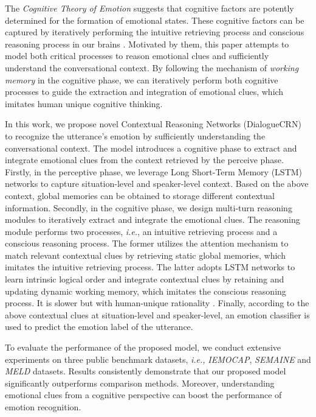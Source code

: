 \documentclass[11pt,a4paper]{article}
\begin{document}
The \textit{Cognitive Theory of Emotion} \cite{article1962,scherer2001appraisal} suggests that cognitive factors are potently determined for the formation of emotional states.
These cognitive factors can be captured by iteratively performing the intuitive retrieving process and conscious reasoning process in our brains \cite{evans1984heuristic,evans2003two,evans2008dual,sloman1996empirical}. 
Motivated by them, this paper attempts to model both critical processes to reason emotional clues and sufficiently understand the conversational context.
By following the mechanism of \textit{working memory} \cite{baddeley1992working} in the cognitive phase, we can iteratively perform both cognitive processes to guide the extraction and integration of emotional clues, which imitates human unique cognitive thinking.




In this work, we propose novel Contextual Reasoning Networks (DialogueCRN) to recognize the utterance's emotion by sufficiently understanding the conversational context.
The model introduces a cognitive phase to extract and integrate emotional clues from the context retrieved by the perceive phase.
Firstly, in the perceptive phase, we leverage Long Short-Term Memory (LSTM) \cite{DBLP:journals/neco/HochreiterS97} networks to capture situation-level and speaker-level context.
Based on the above context, global memories can be obtained to storage different contextual information.
Secondly, in the cognitive phase, we design multi-turn reasoning modules to iteratively extract and integrate the emotional clues.
The reasoning module performs two processes, {\it i.e.}, an intuitive retrieving process and a conscious reasoning process. 
The former utilizes the attention mechanism to match relevant contextual clues by retrieving static global memories, which imitates the intuitive retrieving process.
The latter adopts LSTM networks to learn intrinsic logical order and integrate contextual clues by retaining and updating dynamic working memory, which imitates the conscious reasoning process. It is slower but with human-unique rationality \cite{baddeley1992working}.
Finally, according to the above contextual clues at situation-level and speaker-level, an emotion classifier is used to predict the emotion label of the utterance.






To evaluate the performance of the proposed model, we conduct extensive experiments on three public benchmark datasets, {\it i.e.,} {\it IEMOCAP}, {\it SEMAINE} and {\it MELD} datasets. 
Results consistently demonstrate that our proposed model significantly outperforms comparison methods. 
Moreover, understanding emotional clues from a cognitive perspective can boost the performance of emotion recognition.
\end{document}
